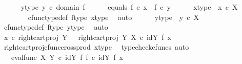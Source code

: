 \begin{isabellebody}
\ \ \ \ \isamarkupfalse%
\ y{\isacharunderscore}{\kern0pt}type{\isacharcolon}{\kern0pt}\ {\isachardoublequoteopen}y\ {\isasymin}\isactrlsub c\ domain\ f{\isachardoublequoteclose}\isanewline
\ \ \ \ \isamarkupfalse%
\ equals{\isacharcolon}{\kern0pt}\ {\isachardoublequoteopen}f\ {\isasymcirc}\isactrlsub c\ x\ {\isacharequal}{\kern0pt}\ f\ {\isasymcirc}\isactrlsub c\ y{\isachardoublequoteclose}\isanewline
\ \ \ \ \isamarkupfalse%
\ x{\isacharunderscore}{\kern0pt}type{}\ {\isacharcolon}{\kern0pt}\ {\isachardoublequoteopen}x\ {\isasymin}\isactrlsub c\ X{\isachardoublequoteclose}\isanewline
\ \ \ \ \ \ \isamarkupfalse%
\ cfunc{\isacharunderscore}{\kern0pt}type{\isacharunderscore}{\kern0pt}def\ f{\isacharunderscore}{\kern0pt}type\ x{\isacharunderscore}{\kern0pt}type\ \isamarkupfalse%
\ auto\isanewline
\ \ \ \ \isamarkupfalse%
\ y{\isacharunderscore}{\kern0pt}type{}\ {\isacharcolon}{\kern0pt}\ {\isachardoublequoteopen}y\ {\isasymin}\isactrlsub c\ X{\isachardoublequoteclose}\isanewline
\ \ \ \ \ \ \isamarkupfalse%
\ cfunc{\isacharunderscore}{\kern0pt}type{\isacharunderscore}{\kern0pt}def\ f{\isacharunderscore}{\kern0pt}type\ y{\isacharunderscore}{\kern0pt}type\ \isamarkupfalse%
\ auto\isanewline
\ \ \ \ \isamarkupfalse%
\ {\isachardoublequoteopen}x\ {\isasymcirc}\isactrlsub c\ {\isacharparenleft}{\kern0pt}right{\isacharunderscore}{\kern0pt}cart{\isacharunderscore}{\kern0pt}proj\ Y\ {\isasymone}{\isacharparenright}{\kern0pt}\ {\isacharequal}{\kern0pt}\ {\isacharparenleft}{\kern0pt}right{\isacharunderscore}{\kern0pt}cart{\isacharunderscore}{\kern0pt}proj\ Y\ X{\isacharparenright}{\kern0pt}\ {\isasymcirc}\isactrlsub c\ {\isacharparenleft}{\kern0pt}id{\isacharparenleft}{\kern0pt}Y{\isacharparenright}{\kern0pt}\ {\isasymtimes}\isactrlsub f\ x{\isacharparenright}{\kern0pt}{\isachardoublequoteclose}\isanewline
\ \ \ \ \ \ \isamarkupfalse%
\ right{\isacharunderscore}{\kern0pt}cart{\isacharunderscore}{\kern0pt}proj{\isacharunderscore}{\kern0pt}cfunc{\isacharunderscore}{\kern0pt}cross{\isacharunderscore}{\kern0pt}prod\ x{\isacharunderscore}{\kern0pt}type{}\ \isamarkupfalse%
\ {\isacharparenleft}{\kern0pt}typecheck{\isacharunderscore}{\kern0pt}cfuncs{\isacharcomma}{\kern0pt}\ auto{\isacharparenright}{\kern0pt}\isanewline
\ \ \ \ \isamarkupfalse%
\ \isamarkupfalse%
\ {\isachardoublequoteopen}{\isachardot}{\kern0pt}{\isachardot}{\kern0pt}{\isachardot}{\kern0pt}\ {\isacharequal}{\kern0pt}\ {\isacharparenleft}{\kern0pt}{\isacharparenleft}{\kern0pt}eval{\isacharunderscore}{\kern0pt}func\ X\ Y{\isacharparenright}{\kern0pt}\ {\isasymcirc}\isactrlsub c\ {\isacharparenleft}{\kern0pt}id{\isacharparenleft}{\kern0pt}Y{\isacharparenright}{\kern0pt}\ {\isasymtimes}\isactrlsub f\ f{\isacharparenright}{\kern0pt}{\isacharparenright}{\kern0pt}\ {\isasymcirc}\isactrlsub c\ {\isacharparenleft}{\kern0pt}id{\isacharparenleft}{\kern0pt}Y{\isacharparenright}{\kern0pt}\ {\isasymtimes}\isactrlsub f\ x{\isacharparenright}{\kern0pt}{\isachardoublequoteclose}\isanewline

\end{isabellebody}
